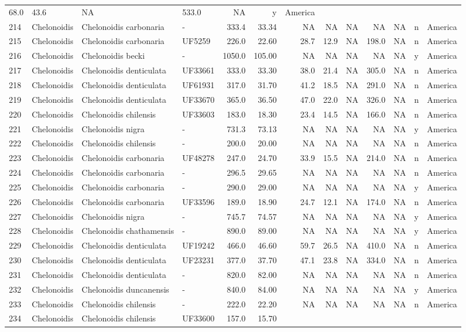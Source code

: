 \begin{landscape}
{\begin{longtable}[]{@{}llllrrrrrrlll@{}}
	68.0 & 43.6 & NA & 533.0 & NA & y & America\tabularnewline
	214 & Chelonoidis & Chelonoidis carbonaria & - & 333.4 & 33.34 & NA & NA
	& NA & NA & NA & n & America\tabularnewline
	215 & Chelonoidis & Chelonoidis carbonaria & UF5259 & 226.0 & 22.60 &
	28.7 & 12.9 & NA & 198.0 & NA & n & America\tabularnewline
	216 & Chelonoidis & Chelonoidis becki & - & 1050.0 & 105.00 & NA & NA &
	NA & NA & NA & y & America\tabularnewline
	217 & Chelonoidis & Chelonoidis denticulata & UF33661 & 333.0 & 33.30 &
	38.0 & 21.4 & NA & 305.0 & NA & n & America\tabularnewline
	218 & Chelonoidis & Chelonoidis denticulata & UF61931 & 317.0 & 31.70 &
	41.2 & 18.5 & NA & 291.0 & NA & n & America\tabularnewline
	219 & Chelonoidis & Chelonoidis denticulata & UF33670 & 365.0 & 36.50 &
	47.0 & 22.0 & NA & 326.0 & NA & n & America\tabularnewline
	220 & Chelonoidis & Chelonoidis chilensis & UF33603 & 183.0 & 18.30 &
	23.4 & 14.5 & NA & 166.0 & NA & n & America\tabularnewline
	221 & Chelonoidis & Chelonoidis nigra & - & 731.3 & 73.13 & NA & NA & NA
	& NA & NA & y & America\tabularnewline
	222 & Chelonoidis & Chelonoidis chilensis & - & 200.0 & 20.00 & NA & NA
	& NA & NA & NA & n & America\tabularnewline
	223 & Chelonoidis & Chelonoidis carbonaria & UF48278 & 247.0 & 24.70 &
	33.9 & 15.5 & NA & 214.0 & NA & n & America\tabularnewline
	224 & Chelonoidis & Chelonoidis carbonaria & - & 296.5 & 29.65 & NA & NA
	& NA & NA & NA & n & America\tabularnewline
	225 & Chelonoidis & Chelonoidis carbonaria & - & 290.0 & 29.00 & NA & NA
	& NA & NA & NA & y & America\tabularnewline
	226 & Chelonoidis & Chelonoidis carbonaria & UF33596 & 189.0 & 18.90 &
	24.7 & 12.1 & NA & 174.0 & NA & n & America\tabularnewline
	227 & Chelonoidis & Chelonoidis nigra & - & 745.7 & 74.57 & NA & NA & NA
	& NA & NA & y & America\tabularnewline
	228 & Chelonoidis & Chelonoidis chathamensis & - & 890.0 & 89.00 & NA &
	NA & NA & NA & NA & y & America\tabularnewline
	229 & Chelonoidis & Chelonoidis denticulata & UF19242 & 466.0 & 46.60 &
	59.7 & 26.5 & NA & 410.0 & NA & n & America\tabularnewline
	230 & Chelonoidis & Chelonoidis denticulata & UF23231 & 377.0 & 37.70 &
	47.1 & 23.8 & NA & 334.0 & NA & n & America\tabularnewline
	231 & Chelonoidis & Chelonoidis denticulata & - & 820.0 & 82.00 & NA &
	NA & NA & NA & NA & n & America\tabularnewline
	232 & Chelonoidis & Chelonoidis duncanensis & - & 840.0 & 84.00 & NA &
	NA & NA & NA & NA & y & America\tabularnewline
	233 & Chelonoidis & Chelonoidis chilensis & - & 222.0 & 22.20 & NA & NA
	& NA & NA & NA & n & America\tabularnewline
	234 & Chelonoidis & Chelonoidis chilensis & UF33600 & 157.0 & 15.70 &

\end{longtable}}
\end{landscape}
